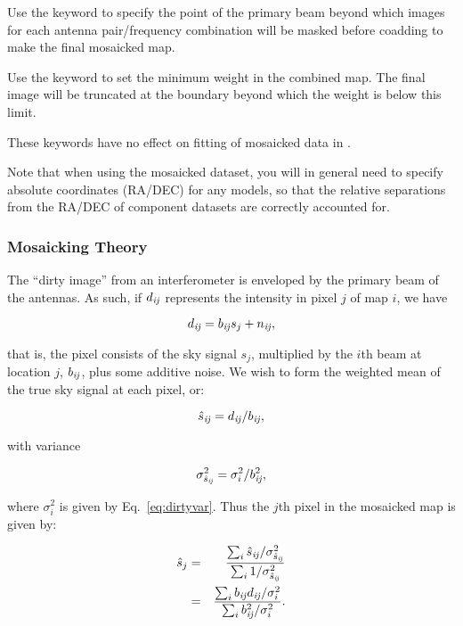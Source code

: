 Use the keyword  to specify the point of the primary beam
beyond which images for each antenna pair/frequency combination will
be masked before coadding to make the final mosaicked map.

Use the keyword  to set the minimum weight in the combined
map.  The final image will be truncated at the boundary beyond
which the weight is below this limit.

These keywords have no effect on fitting of mosaicked data in \climax.

Note that when using the mosaicked dataset, you will in general need
to specify absolute coordinates (RA/DEC) for any models, so that the
relative separations from the RA/DEC of component datasets are
correctly accounted for.

\subsubsection{Mosaicking Theory}

The ``dirty image'' from an interferometer is enveloped by the primary
beam of the antennas.  As such, if $d_{\it ij}$ represents the intensity
in pixel $j$ of map $i$, we have

\begin{equation}
d_{{\it ij}} = b_{{\it ij}}s_j + n_{{\it ij}},
\label{eq:mosmap}
\end{equation}

that is, the pixel consists of the sky signal $s_j$, multiplied by the
$i$th beam at location $j$, $b_{{\it ij}}$, plus some additive noise.  We
wish to form the weighted mean of the true sky signal at each pixel,
or:

\begin{equation}
\hat{s}_{{\it ij}} = d_{{\it ij}}/b_{{\it ij}}, 
\end{equation}

with variance

\begin{equation}
\sigma^2_{\hat{s}_{{\it ij}}} = \sigma^2_i/b^2_{{\it ij}},
\end{equation}

where $\sigma^2_i$ is given by Eq.~\ref{eq:dirtyvar}.  Thus the $j$th
pixel in the mosaicked map is given by:

\begin{eqnarray}
\hat{s}_j &=& {{\sum_i{\hat{s}_{{\it ij}}/\sigma^2_{\hat{s}_{{\it ij}}}}}\over{\sum_i{1/\sigma^2_{\hat{s}_{{\it ij}}}}}}\\
          &=& {{\sum_i{b_{{\it ij}}d_{{\it ij}}/\sigma^2_i}}\over{\sum_i{b^2_{{\it ij}}/\sigma^2_{i}}}}.
\label{eq:signal}
\end{eqnarray}

